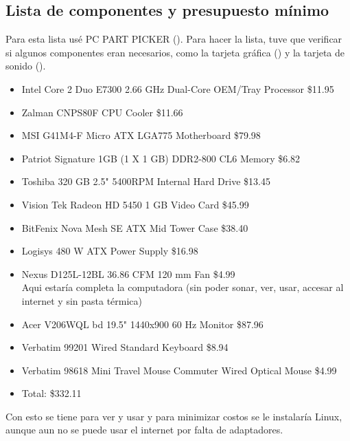 \documentclass[12pt, a4paper, twocolumn]{article}
\begin{document}
\subsection{Lista de componentes y presupuesto mínimo}
Para esta lista usé PC PART PICKER (\cite{partpickerminimum}). Para hacer la lista, tuve que verificar si algunos componentes eran necesarios, como la tarjeta gráfica () y la tarjeta de sonido ().
\begin{itemize}
    \item Intel Core 2 Duo E7300 2.66 GHz Dual-Core OEM/Tray Processor  \$11.95
    \item Zalman CNPS80F CPU Cooler                                     \$11.66
    \item MSI G41M4-F Micro ATX LGA775 Motherboard                      \$79.98
    \item Patriot Signature 1GB (1 X 1 GB) DDR2-800 CL6 Memory          \$6.82
    \item Toshiba 320 GB 2.5" 5400RPM Internal Hard Drive               \$13.45
    \item Vision Tek Radeon HD 5450 1 GB Video Card                     \$45.99
    \item BitFenix Nova Mesh SE ATX Mid Tower Case                      \$38.40
    \item Logisys 480 W ATX Power Supply                                \$16.98
    \item Nexus D125L-12BL 36.86 CFM 120 mm Fan                         \$4.99 \\
Aqui estaría completa la computadora (sin poder sonar, ver, usar, accesar al internet y sin pasta térmica)
    \item Acer V206WQL bd 19.5" 1440x900 60 Hz Monitor                  \$87.96
    \item Verbatim 99201 Wired Standard Keyboard                        \$8.94
    \item Verbatim 98618 Mini Travel Mouse Commuter Wired Optical Mouse \$4.99
    \item Total: \$332.11
\end{itemize}
Con esto se tiene para ver y usar y para minimizar costos se le instalaría Linux, aunque aun no se puede usar el internet por falta de adaptadores.
\end{document}
